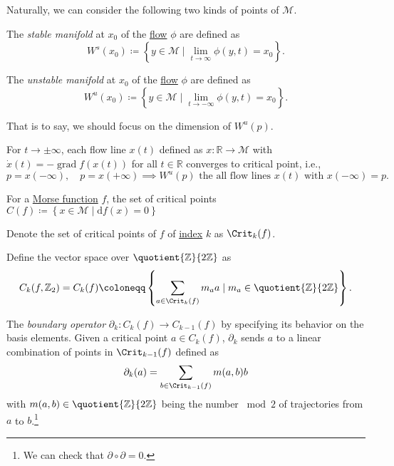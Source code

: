 Naturally, we can consider the following two kinds of points of \(\mathcal{M} \).

\begin{definition}\label{def:stable-manifold}
	The \emph{stable manifold} at \(x_0\) of the \hyperref[def:negative-gradient-flow]{flow} \(\phi \) are defined as
	\[
		W^s (x_0) \coloneqq \left\{ y\in \mathcal{M} \mid \lim_{t \to \infty} \phi (y, t) = x_0 \right\}.
	\]
\end{definition}

\begin{definition}\label{def:unstable-manifold}
	The \emph{unstable manifold} at \(x_0\) of the \hyperref[def:negative-gradient-flow]{flow} \(\phi \) are defined as
	\[
		W^u (x_0) \coloneqq \left\{ y\in \mathcal{M} \mid \lim_{t \to -\infty} \phi (y, t) = x_0 \right\}.
	\]
\end{definition}

That is to say, we should focus on the dimension of \(W^u(p)\).

\begin{intuition}
	For \(t \to \pm \infty \), each flow line \(x(t)\) defined as \(x\colon \mathbb{R} \to \mathcal{M} \) with \(\dot{x} (t) = -\operatorname{grad} f(x(t))\) for all \(t\in \mathbb{R} \) converges to critical point, i.e.,
	\[
		p = x(-\infty ), \quad
		p = x(+\infty )
		\implies W^u(p) \text{ the all flow lines } x(t) \text{ with } x(-\infty ) = p.
	\]
\end{intuition}

\begin{prev}
	For a \hyperref[def:Morse-function]{Morse function} \(f\), the set of critical points \(C(f) \coloneqq \left\{ x\in \mathcal{M} \mid \mathrm{d} f (x) = 0 \right\} \)
\end{prev}

\begin{notation}
	Denote the set of critical points of \(f\) of \hyperref[def:Morse-index]{index} \(k\) as \(\Crit_{k}(f)\).
\end{notation}

\begin{definition}\label{def:Morse-complex}
	Define the vector space over \(\quotient{\mathbb{Z}}{2\mathbb{Z}} \) as
	\[
		C_k(f, \mathbb{Z} _2) = C_k(f) \coloneqq \left\{ \sum_{a \in \Crit_{k}(f) } m_a a  \mid m_a \in \quotient{\mathbb{Z} }{2\mathbb{Z} } \right\}.
	\]
	\begin{definition}\label{def:boundary-operator}
		The \emph{boundary operator} \(\partial _k \colon C_k(f) \to C_{k-1}(f)\) by specifying its behavior on the basis elements. Given a critical point \(a\in C_k(f)\), \(\partial _k\) sends \(a\) to a linear combination of points in \(\Crit_{k-1}(f) \) defined as
		\[
			\partial _k(a) = \sum_{b\in \Crit_{k-1}(f) } m(a, b) b
		\]
		with \(m(a, b) \in \quotient{\mathbb{Z} }{2\mathbb{Z} } \) being the number \(\bmod 2\) of trajectories from \(a\) to \(b\).\footnote{We can check that \(\partial \circ \partial = 0\).}
	\end{definition}
\end{definition}

